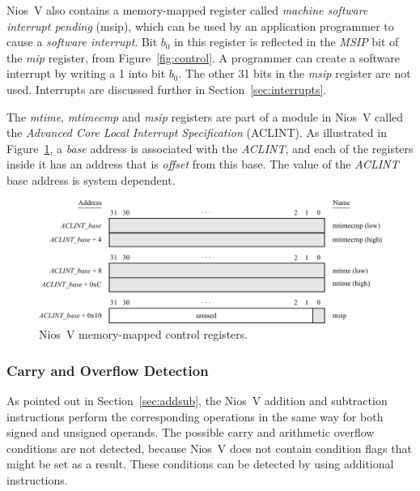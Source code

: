 \documentclass[11pt, twoside, pdftex]{article}
\begin{document}
Nios~V also contains a memory-mapped register called {\it machine software interrupt
pending} (msip), which can be used by an application programmer to cause a 
{\it software interrupt}. Bit $b_0$ in this register is reflected in the {\it MSIP} bit of 
the {\it mip} register, from Figure~\ref{fig:control}. A programmer can create a software 
interrupt by writing a 1 into bit $b_0$. The other 31 bits in the {\it msip} register are not
used. Interrupts are discussed further in Section~\ref{sec:interrupts}.

The {\it mtime}, {\it mtimecmp} and {\it msip} registers are part of a module in Nios~V called
the {\it Advanced Core Local Interrupt Specification} (ACLINT). As illustrated in 
Figure~\ref{fig:mm_control}, a {\it base} address is associated with the {\it ACLINT}, and 
each of the registers inside it has an address that is {\it offset} from this base. The value of
the {\it ACLINT} base address is system dependent. 

\begin{figure}[h]
   \begin{center}
      \includegraphics[scale=.9]{figures/mm_control_registers.pdf}
   \caption{Nios~V memory-mapped control registers.} 
	 \label{fig:mm_control}
	 \end{center}
\end{figure}

\subsubsection{Carry and Overflow Detection}
\label{sec:overflow}

As pointed out in Section~\ref{sec:addsub}, the Nios~V addition and subtraction instructions 
perform the corresponding operations
in the same way for both signed and unsigned operands. The possible carry and arithmetic overflow
conditions are not detected, because Nios~V does not contain condition flags that might be set as
a result. These conditions can be detected by using additional instructions.
\end{document}
